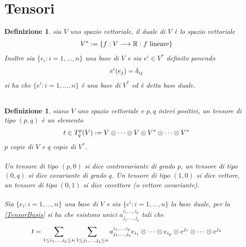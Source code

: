 \documentclass[oneside, 11pt]{amsbook}
\newcommand{\0}{{(0)}}
\newcommand{\3}{{(3)}}
\theoremstyle{colonplain}
\theoremstyle{colondefinition}
\newtheorem{defn}[thm]{Definizione}
\theoremstyle{colonremark}
\numberwithin{equation}{chapter}
\begin{document}
\section{Tensori}
\begin{defn} sia $V$ uno spazio vettoriale, il \textit{duale} di $V$ è lo spazio vettoriale
\begin{align}
    V^* := \{ f : V \longrightarrow \mathbb{R} : f \text{ lineare} \} \notag
\end{align}
Inoltre sia $\{ e_i : i = 1, \dots, n \}$ una base di $V$ e sia $e^i \in V^*$ definito ponendo
\begin{align}
    e^i(e_j) = \delta_{ij} \notag
\end{align}
si ha che $\{ e^i : i = 1, \dots, n \}$ è una base di $V^*$ ed è detta \textit{base duale}. \\ \\
\end{defn}
\begin{defn} siano $V$ uno spazio vettoriale e $p, q$ interi positivi, un \textit{tensore} di tipo $(p, q)$ è un elemento
\begin{align}
    t \in T^p_q(V) := V \otimes \dots \otimes V \otimes V^* \otimes \dots \otimes V^* \notag
\end{align}
$p$ copie di $V$ e $q$ copie di $V^*$. \\ \\
Un tensore di tipo $(p, 0)$ si dice \textit{controvariante} di grado $p$, un tensore di tipo $(0, q)$ si dice \textit{covariante} di grado $q$. Un tensore di tipo $(1, 0)$ si dice \textit{vettore}, un tensore di tipo $(0, 1)$ si dice \textit{covettore} (o \textit{vettore covariante}). \\ \\ 
Sia $\{ e_i : i = 1, \dots, n \}$ una base di $V$ e sia $\{ e^i : i = 1, \dots, n \}$ la base duale, per la \cref{TensorBasis} si ha che esistono unici $a^{i_1, \dots, i_p}_{j_1, \dots, j_q}$ tali che
\begin{align}
    t = \sum_{1 \leq i_1, \dots, i_p \leq n} \sum_{1 \leq j_1, \dots, j_q \leq n} a^{i_1, \dots, i_p}_{j_1, \dots, j_q} e_{i_1} \otimes \dots \otimes e_{i_p} \otimes e^{j_1} \otimes \dots \otimes e^{j_q} \notag
\end{align} \\ \\
\end{defn}
\end{document}
